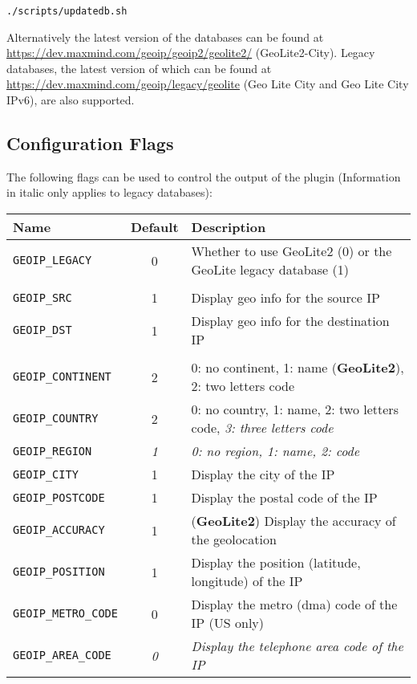 \documentclass[documentation]{subfiles}
\begin{document}
\begin{center}
    {\tt ./scripts/updatedb.sh}
\end{center}

\noindent Alternatively the latest version of the databases can be found at \url{https://dev.maxmind.com/geoip/geoip2/geolite2/} (GeoLite2-City). Legacy databases, the latest version of which can be found at \url{https://dev.maxmind.com/geoip/legacy/geolite} (Geo Lite City and Geo Lite City IPv6), are also supported.

\subsection{Configuration Flags}
The following flags can be used to control the output of the plugin (Information in italic only applies to legacy databases):
\begin{longtable}{lcl}
    \toprule
    {\bf Name} & {\bf Default} & {\bf Description} \\
    \midrule\endhead%
    {\tt GEOIP\_LEGACY} & 0 & Whether to use GeoLite2 (0) or the GeoLite legacy database (1)\\
    &\\
    {\tt GEOIP\_SRC} & 1 & Display geo info for the source IP\\
    {\tt GEOIP\_DST} & 1 & Display geo info for the destination IP\\
    &\\
    {\tt GEOIP\_CONTINENT} & 2 & 0: no continent, 1: name ({\bf GeoLite2}), 2: two letters code\\
    {\tt GEOIP\_COUNTRY} & 2 & 0: no country, 1: name, 2: two letters code, {\em 3: three letters code}\\
    {\tt GEOIP\_REGION} & {\em 1} & {\em 0: no region, 1: name, 2: code}\\
    {\tt GEOIP\_CITY} & 1 & Display the city of the IP\\
    {\tt GEOIP\_POSTCODE} & 1 & Display the postal code of the IP\\
    {\tt GEOIP\_ACCURACY} & 1 & ({\bf GeoLite2}) Display the accuracy of the geolocation\\
    {\tt GEOIP\_POSITION} & 1 & Display the position (latitude, longitude) of the IP\\
    {\tt GEOIP\_METRO\_CODE} & 0 & Display the metro (dma) code of the IP (US only)\\
    {\tt GEOIP\_AREA\_CODE} & {\em 0} & {\em Display the telephone area code of the IP}\\

\end{longtable}
\end{document}
